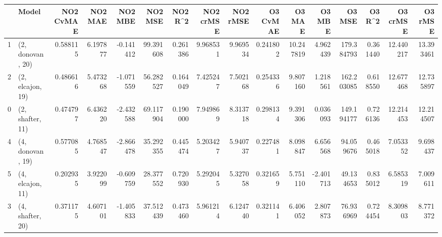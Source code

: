 \begin{tabular}{llrrrrrrrrrrrrrr}
\toprule
{} &             Model &  NO2 CvMAE &   NO2 MAE &   NO2 MBE &    NO2 MSE &   NO2 R\textasciicircum2 &  NO2 crMSE &  NO2 rMSE &  O3 CvMAE &     O3 MAE &    O3 MBE &      O3 MSE &    O3 R\textasciicircum2 &   O3 crMSE &    O3 rMSE \\
\midrule
1 &  (2, donovan, 20) &   0.588115 &  6.197877 & -0.141412 &  99.391608 &  0.261386 &   9.968531 &  9.969534 &  0.241802 &  10.247819 &  4.962439 &  179.384793 &  0.361440 &  12.440217 &  13.393461 \\
2 &  (2, elcajon, 19) &   0.486616 &  5.473268 & -1.071559 &  56.282527 &  0.164049 &   7.425247 &  7.502168 &  0.254336 &   9.807160 &  1.218561 &  162.203085 &  0.618550 &  12.677468 &  12.735897 \\
0 &  (2, shafter, 11) &   0.474797 &  6.436220 & -2.432588 &  69.117904 &  0.190000 &   7.949869 &  8.313718 &  0.298134 &   9.391306 &  0.036093 &  149.194177 &  0.726136 &  12.214453 &  12.214507 \\
4 &  (4, donovan, 19) &   0.577085 &  4.768547 & -2.866478 &  35.292355 &  0.445474 &   5.203427 &  5.940737 &  0.227481 &   8.098847 &  6.656568 &   94.059676 &  0.465018 &   7.053352 &   9.698437 \\
5 &  (4, elcajon, 11) &   0.202935 &  3.922099 & -0.609759 &  28.377552 &  0.720930 &   5.292045 &  5.327058 &  0.321659 &   5.751110 & -2.401713 &   49.134653 &  0.835012 &   6.585319 &   7.009611 \\
3 &  (4, shafter, 20) &   0.371175 &  4.607101 & -1.405833 &  37.512439 &  0.473460 &   5.961214 &  6.124740 &  0.321141 &   6.406052 &  2.807873 &   76.936969 &  0.724454 &   8.309803 &   8.771372 \\
\bottomrule
\end{tabular}
